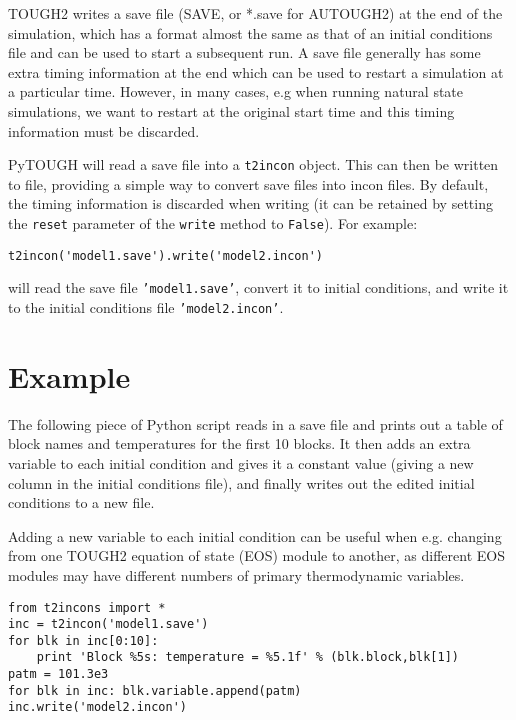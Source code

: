 TOUGH2 writes a save file (SAVE, or *.save for AUTOUGH2) at the end of the simulation, which has a format almost the same as that of an initial conditions file and can be used to start a subsequent run.  A save file generally has some extra timing information at the end which can be used to restart a simulation at a particular time.  However, in many cases, e.g when running natural state simulations, we want to restart at the original start time and this timing information must be discarded.

PyTOUGH will read a save file into a \texttt{t2incon} object.  This can then be written to file, providing a simple way to convert save files into incon files.  By default, the timing information is discarded when writing (it can be retained by setting the \texttt{reset} parameter of the \texttt{write} method to \texttt{False}).  For example:

\begin{lstlisting}
t2incon('model1.save').write('model2.incon')
\end{lstlisting}

will read the save file \texttt{'model1.save'}, convert it to initial conditions, and write it to the initial conditions file \texttt{'model2.incon'}.

\section{Example}

The following piece of Python script reads in a save file and prints out a table of block names and temperatures for the first 10 blocks.  It then adds an extra variable to each initial condition and gives it a constant value (giving a new column in the initial conditions file), and finally writes out the edited initial conditions to a new file.

Adding a new variable to each initial condition can be useful when e.g. changing from one TOUGH2 equation of state (EOS) module to another, as different EOS modules may have different numbers of primary thermodynamic variables.

\begin{lstlisting}
from t2incons import *
inc = t2incon('model1.save')
for blk in inc[0:10]:
    print 'Block %5s: temperature = %5.1f' % (blk.block,blk[1])
patm = 101.3e3
for blk in inc: blk.variable.append(patm)
inc.write('model2.incon')
\end{lstlisting}

